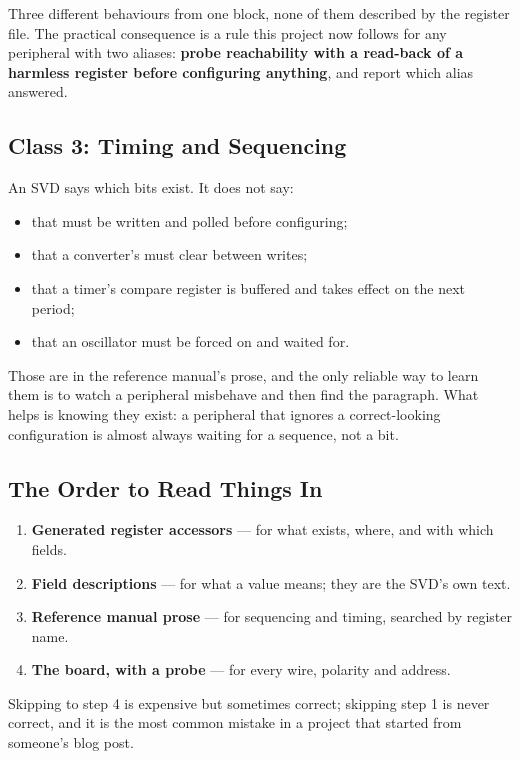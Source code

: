 Three different behaviours from one block, none of them described by the register file. The practical
consequence is a rule this project now follows for any peripheral with two aliases: \textbf{probe
reachability with a read-back of a harmless register before configuring anything}, and report which
alias answered.

\subsection{Class 3: Timing and Sequencing}

An SVD says which bits exist. It does not say:

\begin{itemize}
    \item that  must be written and  polled before configuring;
    \item that a converter's  must clear between writes;
    \item that a timer's compare register is buffered and takes effect on the next period;
    \item that an oscillator must be forced on and waited for.
\end{itemize}

Those are in the reference manual's prose, and the only reliable way to learn them is to watch a
peripheral misbehave and then find the paragraph. What helps is knowing they exist: a peripheral that
ignores a correct-looking configuration is almost always waiting for a sequence, not a bit.

\subsection{The Order to Read Things In}

\begin{enumerate}
    \item \textbf{Generated register accessors} — for what exists, where, and with which fields.
    \item \textbf{Field descriptions} — for what a value means; they are the SVD's own text.
    \item \textbf{Reference manual prose} — for sequencing and timing, searched by register name.
    \item \textbf{The board, with a probe} — for every wire, polarity and address.
\end{enumerate}

Skipping to step 4 is expensive but sometimes correct; skipping step 1 is never correct, and it is the
most common mistake in a project that started from someone's blog post.
